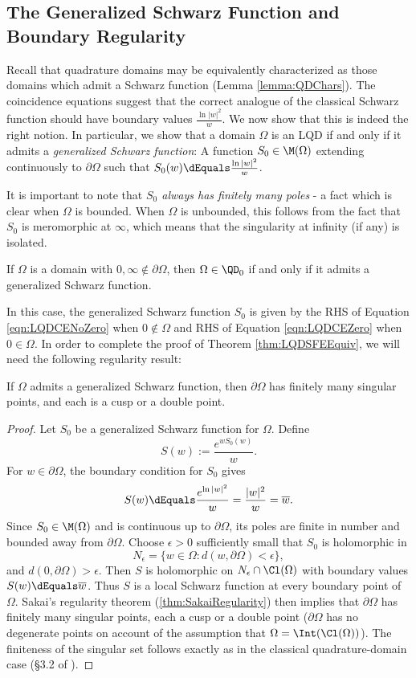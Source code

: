 \documentclass{article}
\numberwithin{equation}{section}
\begin{document}
\subsection{The Generalized Schwarz Function and Boundary Regularity}
Recall that quadrature domains may be equivalently characterized as those domains which admit a Schwarz function (Lemma \ref{lemma:QDChars}). The coincidence equations suggest that the correct analogue of the classical Schwarz function should have boundary values $\frac{\ln|w|^2}{w}$. We now show that this is indeed the right notion. In particular, we show that a domain $\Omega$ is an LQD if and only if it admits a \emph{generalized Schwarz function}: A function $S_0\in\M(\Omega)$ extending continuously to $\partial\Omega$ such that $S_0(w)\dEquals\frac{\ln|w|^2}{w}$. 

It is important to note that \emph{$S_0$ always has finitely many poles} - a fact which is clear when $\Omega$ is bounded. When $\Omega$ is unbounded, this follows from the fact that $S_0$ is meromorphic at $\infty$, which means that the singularity at infinity (if any) is isolated.

\begin{theorem}\label{thm:LQDSFEEquiv}
If $\Omega$ is a domain with $0,\infty\notin\partial\Omega$, then $\Omega\in\QD_0$ if and only if it admits a generalized Schwarz function.
\end{theorem}
In this case, the generalized Schwarz function $S_0$ is given by the RHS of Equation \ref{eqn:LQDCENoZero} when $0\notin\Omega$ and RHS of Equation \ref{eqn:LQDCEZero} when $0\in\Omega$. In order to complete the proof of Theorem \ref{thm:LQDSFEEquiv}, we will need the following regularity result: 

\begin{lemma}\label{lemma:GSFBoundaryRegularity}
    If $\Omega$ admits a generalized Schwarz function, then $\partial\Omega$ has finitely many singular points, and each is a cusp or a double point.
\end{lemma}
\begin{proof}
Let $S_0$ be a generalized Schwarz function for $\Omega$. Define
$$S(w):=\dfrac{e^{wS_0(w)}}{w}.$$
For $w\in\partial\Omega$, the boundary condition for $S_0$ gives
$$S(w)\dEquals\dfrac{e^{\ln|w|^2}}{w}=\dfrac{|w|^2}{w}=\overline{w}.$$
Since $S_0\in\M(\Omega)$ and is continuous up to $\partial\Omega$, its poles are finite in number and bounded away from $\partial\Omega$. Choose $\epsilon>0$ sufficiently small that $S_0$ is holomorphic in 
$$N_\epsilon=\{w\in\Omega:d(w,\partial\Omega)<\epsilon\},$$
and $d(0,\partial\Omega)>\epsilon$. Then $S$ is holomorphic on $N_\epsilon\cap\Cl(\Omega)$ with boundary values $S(w)\dEquals\overline{w}$. Thus $S$ is a local Schwarz function at every boundary point of $\Omega$. Sakai's regularity theorem (\ref{thm:SakaiRegularity}) then implies that $\partial\Omega$ has finitely many singular points, each a cusp or a double point ($\partial\Omega$ has no degenerate points on account of the assumption that $\Omega=\Int(\Cl(\Omega))$). The finiteness of the singular set follows exactly as in the classical quadrature-domain case (\S3.2 of \cite{Lee_2015}).
\end{proof}
\end{document}
